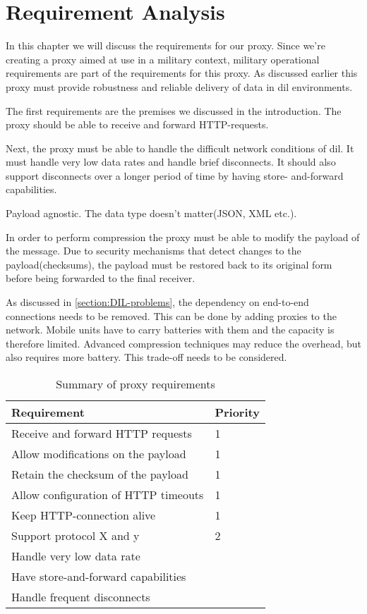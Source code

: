\chapter{Requirement Analysis}

In this chapter we will discuss the requirements for our proxy. Since we're
creating a proxy aimed at use in a military context, military operational
requirements are part of the requirements for this proxy. As discussed earlier
this proxy must provide robustness and reliable delivery of data in \gls{dil}
environments.

The first requirements are the premises we discussed in the introduction. The
proxy should be able to receive and forward HTTP-requests.

Next, the proxy must be able to handle the difficult network conditions of
dil. It must handle very low data rates and handle brief disconnects. It
should also support disconnects over a longer period of time by having store-
and-forward capabilities.

Payload agnostic. The data type doesn't matter(JSON, XML etc.).

In order to perform compression the proxy must be able to modify the payload
of the message. Due to security mechanisms that detect changes to the
payload(checksums), the payload must be restored back to its original form
before being forwarded to the final receiver.

As discussed in \cref{section:DIL-problems}, the dependency on end-to-end
connections needs to be removed. This can be done by adding proxies to the
network. Mobile units have to carry batteries with them and the capacity is
therefore limited. Advanced compression techniques may reduce the overhead,
but also requires more battery. This trade-off needs to be considered.


\begin{table}[h]
\begin{tabular}{| l | l |}
\hline
  \textbf{Requirement} & \textbf{Priority} \\ \hline
  Receive and forward HTTP requests & 1\\ \hline
  Allow modifications on the payload & 1 \\ \hline
  Retain the checksum of the payload & 1 \\ \hline
  Allow configuration of HTTP timeouts & 1 \\ \hline
  Keep HTTP-connection alive & 1 \\ \hline
  Support protocol X and y & 2 \\ \hline
  Handle very low data rate \\ \hline
  Have store-and-forward capabilities \\ \hline
  Handle frequent disconnects\\ \hline
\end{tabular}
\caption{Summary of proxy requirements}
\end{table}


